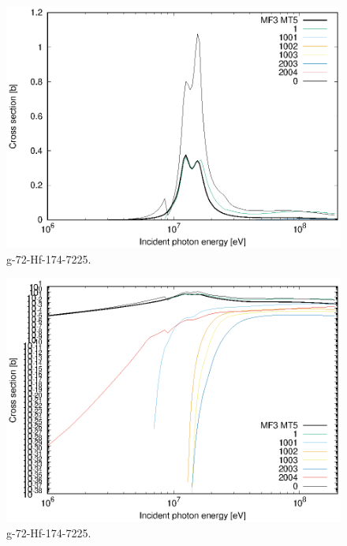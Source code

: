 \begin{figure}
 \includegraphics[width=\linewidth]{eps/g_72-Hf-174_7225.eps}
  \caption{g-72-Hf-174-7225.}
\end{figure}
\begin{figure}
 \includegraphics[width=\linewidth]{eps-log/g_72-Hf-174_7225.eps}
 \caption{g-72-Hf-174-7225.}
\end{figure}
\newpage \clearpage

